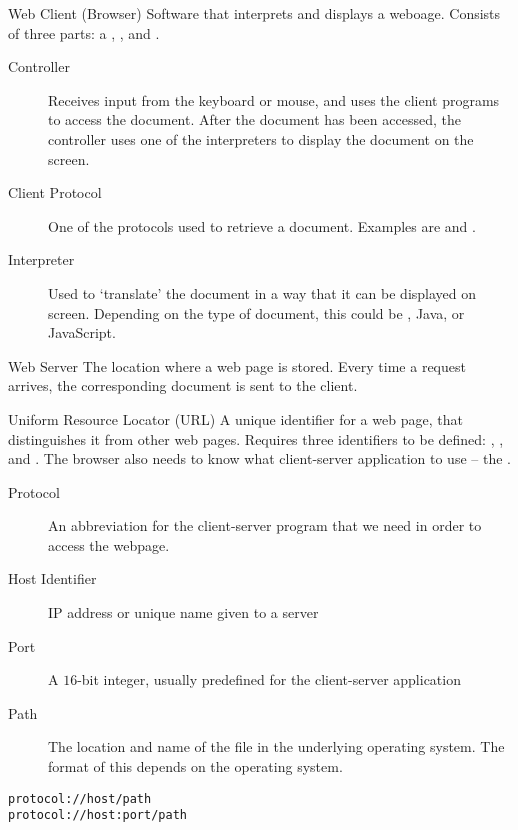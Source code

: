 \documentclass[\main/notes.tex]{subfiles}
\begin{document}
					\begin{definition}{Web Client (Browser)}
						Software that interprets and displays a weboage. Consists of three parts: a , , and .
						\begin{indentparagraph}
							\begin{description}
								\item[Controller] Receives input from the keyboard or mouse, and uses the client programs to access the document. After the document has been accessed, the controller uses one of the interpreters to display the document on the screen.
								\item[Client Protocol] One of the protocols used to retrieve a document. Examples are  and .
								\item[Interpreter] Used to `translate' the document in a way that it can be displayed on screen. Depending on the type of document, this could be , Java, or JavaScript. 
							\end{description}
						\end{indentparagraph}
					\end{definition}
					\begin{definition}{Web Server}
						The location where a web page is stored. Every time a request arrives, the corresponding document is sent to the client.
					\end{definition}
					\begin{definition}{Uniform Resource Locator (URL)}
						A unique identifier for a web page, that distinguishes it from other web pages. Requires three identifiers to be defined: , , and . The browser also needs to know what client-server application to use -- the \concept{protocol}.
						\begin{indentparagraph}
							\begin{description}
								\item[Protocol] An abbreviation for the client-server program that we need in order to access the webpage.
								\item[Host Identifier] IP address or unique name given to a server
								\item[Port] A $16$-bit integer, usually predefined for the client-server application
								\item[Path] The location and name of the file in the underlying operating system. The format of this depends on the operating system.
							\end{description}
							\begin{center}
								\texttt{protocol://host/path}\\
								\texttt{protocol://host:port/path}
							\end{center}
						\end{indentparagraph}
					\end{definition}
\end{document}

